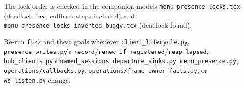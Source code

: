 \documentclass[a4paper,10pt,fleqn]{article}
\begin{document}
The lock order is checked in the companion models
\texttt{menu\_presence\_locks.tex} (deadlock-free, callback steps included) and
\texttt{menu\_presence\_locks\_inverted\_buggy.tex} (deadlock found).

Re-run \texttt{fuzz} and these goals whenever
\texttt{client\_lifecycle.py}, \texttt{presence\_writes.py}'s
\texttt{record}/\texttt{renew\_if\_registered}/\texttt{reap\_lapsed},
\texttt{hub\_clients.py}'s \texttt{named\_sessions},
\texttt{departure\_sinks.py}, \texttt{menu\_presence.py},
\texttt{operations/callbacks.py}, \texttt{operations/frame\_owner\_facts.py}, or
\texttt{ws\_listen.py} change.
\end{document}
